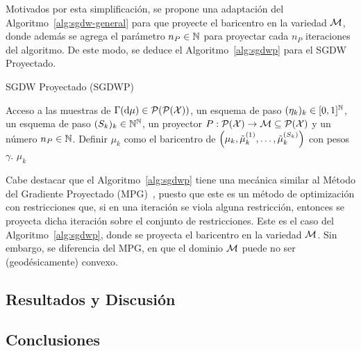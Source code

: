 Motivados por esta simplificación, se propone una adaptación del Algoritmo~\ref{alg:sgdw-general} para que proyecte el baricentro en la variedad $\Manifold$, donde además se agrega el parámetro $n_P\in\N$ para proyectar cada $n_P$ iteraciones del algoritmo. De este modo, se deduce el Algoritmo~\ref{alg:sgdwp} para el SGDW Proyectado.
\begin{algorithm}[H]
    \caption{SGDW Proyectado (SGDWP)}
    \label{alg:sgdwp}
    \begin{algorithmic}[1]
        \Require Acceso a las muestras de $\Gamma(\dd \mu) \in \ProbSpace[\ProbSpace]$, un esquema de paso $(\eta_k)_k \in [0, 1]^\N$, un esquema de paso $(S_k)_k \in \N^\N$, un proyector $P:\ProbSpace[\cX] \to \Manifold\subseteq \ProbSpace[\cX] $ y un número $n_P \in \N$.
        \Repeat
        \State Definir $\mu_k$ como el baricentro de $\qty( \mu_k, \tilde\mu_k^{(1)}, \dots, \tilde\mu_k^{(S_k)} )$ con pesos $\gamma$.
        \EndIf
        \State\Return $\mu_k$
    \end{algorithmic}
\end{algorithm}


Cabe destacar que el Algoritmo~\ref{alg:sgdwp} tiene una mecánica similar al Método del Gradiente Proyectado (MPG)~\cite[Secc. 5.1]{optimizacion2022amaya}, puesto que este es un método de optimización con restricciones que, si en una iteración se viola alguna restricción, entonces se proyecta dicha iteración sobre el conjunto de restricciones. Este es el caso del Algoritmo~\ref{alg:sgdwp}, donde se proyecta el baricentro en la variedad $\Manifold$. Sin embargo, se diferencia del MPG, en que el dominio $\Manifold$ puede no ser (geodésicamente) convexo.



\subsection{Resultados y Discusión}\label{ssec:sgdwp-resultados-discusion}  %

\subsection{Conclusiones}\label{ssec:sgdwp-conclusiones}  %

